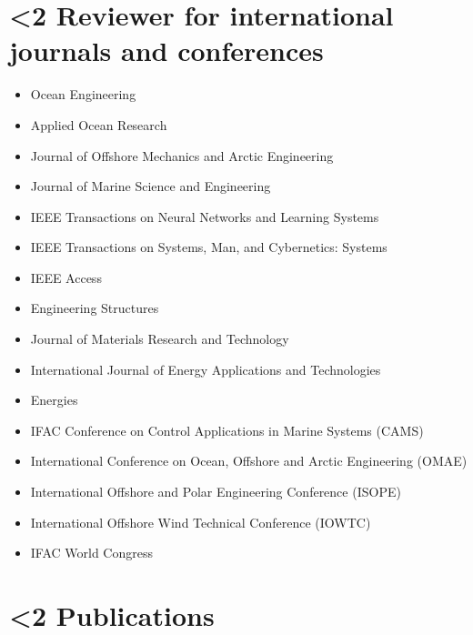 \documentclass[10pt]{ctexart}
\begin{document}
\section*{\textbf{\ifnum\value{num}<2 {Reviewer for international journals and conferences}  \fi}}
\begin{itemize}[label={}] \setlength\itemsep{0.5em}
\item Ocean Engineering%
\item Applied Ocean Research
\item Journal of Offshore Mechanics and Arctic Engineering%
\item Journal of Marine Science and Engineering%
\item IEEE Transactions on Neural Networks and Learning Systems%
\item IEEE Transactions on Systems, Man, and Cybernetics: Systems
\item IEEE Access%
\item Engineering Structures%
\item Journal of Materials Research and Technology%
\item International Journal of Energy Applications and Technologies%
\item Energies%
\item IFAC Conference on Control Applications in Marine Systems (CAMS)%
\item International Conference on Ocean, Offshore and Arctic Engineering (OMAE)%
\item International Offshore and Polar Engineering Conference (ISOPE)%
\item International Offshore Wind Technical Conference (IOWTC)%
\item IFAC World Congress%
\end{itemize}
\vspace*{0.5em}

\section*{\textbf{\ifnum\value{num}<2 {Publications}  \fi}}
\end{document}

